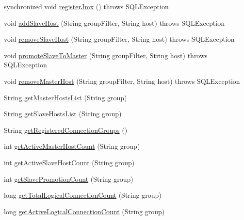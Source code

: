 \begin{DoxyCompactItemize}
\item 
synchronized void \mbox{\hyperlink{classcom_1_1mysql_1_1cj_1_1jdbc_1_1jmx_1_1_replication_group_manager_ac82ea242ca350bee06e9ce072bff1f3a}{register\+Jmx}} ()  throws S\+Q\+L\+Exception 
\item 
void \mbox{\hyperlink{classcom_1_1mysql_1_1cj_1_1jdbc_1_1jmx_1_1_replication_group_manager_a30c0567e7ae4bdca704ffe7a8f45f8ce}{add\+Slave\+Host}} (String group\+Filter, String host)  throws S\+Q\+L\+Exception 
\item 
void \mbox{\hyperlink{classcom_1_1mysql_1_1cj_1_1jdbc_1_1jmx_1_1_replication_group_manager_a56956d19b252d2f12b5e345a8df2be4b}{remove\+Slave\+Host}} (String group\+Filter, String host)  throws S\+Q\+L\+Exception 
\item 
void \mbox{\hyperlink{classcom_1_1mysql_1_1cj_1_1jdbc_1_1jmx_1_1_replication_group_manager_a97a4d471528e70781d141c633c3fa9d0}{promote\+Slave\+To\+Master}} (String group\+Filter, String host)  throws S\+Q\+L\+Exception 
\item 
void \mbox{\hyperlink{classcom_1_1mysql_1_1cj_1_1jdbc_1_1jmx_1_1_replication_group_manager_a055b835430302ebd6361b7644082878e}{remove\+Master\+Host}} (String group\+Filter, String host)  throws S\+Q\+L\+Exception 
\item 
String \mbox{\hyperlink{classcom_1_1mysql_1_1cj_1_1jdbc_1_1jmx_1_1_replication_group_manager_adaeaa362a31a245bf62d0a3d475e80d5}{get\+Master\+Hosts\+List}} (String group)
\item 
String \mbox{\hyperlink{classcom_1_1mysql_1_1cj_1_1jdbc_1_1jmx_1_1_replication_group_manager_a0fb158d2a83806c0f3777283e54afb3c}{get\+Slave\+Hosts\+List}} (String group)
\item 
String \mbox{\hyperlink{classcom_1_1mysql_1_1cj_1_1jdbc_1_1jmx_1_1_replication_group_manager_ae3d3e1c40a74c776fc278037a495d994}{get\+Registered\+Connection\+Groups}} ()
\item 
int \mbox{\hyperlink{classcom_1_1mysql_1_1cj_1_1jdbc_1_1jmx_1_1_replication_group_manager_aeaf341ab42e2a5aeddfbecc3fcca77aa}{get\+Active\+Master\+Host\+Count}} (String group)
\item 
int \mbox{\hyperlink{classcom_1_1mysql_1_1cj_1_1jdbc_1_1jmx_1_1_replication_group_manager_a2117c9606bad33930ecdcb5544ee2f52}{get\+Active\+Slave\+Host\+Count}} (String group)
\item 
int \mbox{\hyperlink{classcom_1_1mysql_1_1cj_1_1jdbc_1_1jmx_1_1_replication_group_manager_ab04bb89c8eddbbeb6fcf1dea8c3b85df}{get\+Slave\+Promotion\+Count}} (String group)
\item 
long \mbox{\hyperlink{classcom_1_1mysql_1_1cj_1_1jdbc_1_1jmx_1_1_replication_group_manager_a674fa2c13d7ce64451573c38a63fda97}{get\+Total\+Logical\+Connection\+Count}} (String group)
\item 
long \mbox{\hyperlink{classcom_1_1mysql_1_1cj_1_1jdbc_1_1jmx_1_1_replication_group_manager_a598cb188481a4d613050a2452d07e456}{get\+Active\+Logical\+Connection\+Count}} (String group)
\end{DoxyCompactItemize}


